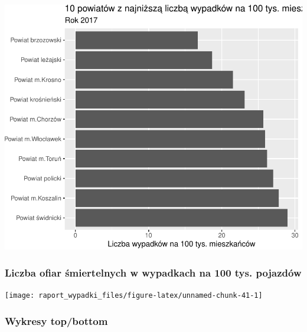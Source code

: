 \documentclass[
]{article}
\begin{document}
\begin{flushleft}\includegraphics{raport_wypadki_files/figure-latex/unnamed-chunk-40-1} \end{flushleft}

\hypertarget{liczba-ofiar-ux15bmiertelnych-w-wypadkach-na-100-tys.-pojazduxf3w}{%
\subsubsection{Liczba ofiar śmiertelnych w wypadkach na 100 tys.
pojazdów}\label{liczba-ofiar-ux15bmiertelnych-w-wypadkach-na-100-tys.-pojazduxf3w}}

\begin{flushleft}\texttt{[image: raport\_wypadki\_files/figure-latex/unnamed-chunk-41-1]} \end{flushleft}

\hypertarget{wykresy-topbottom-1}{%
\subsubsection{Wykresy top/bottom}\label{wykresy-topbottom-1}}
\end{document}
